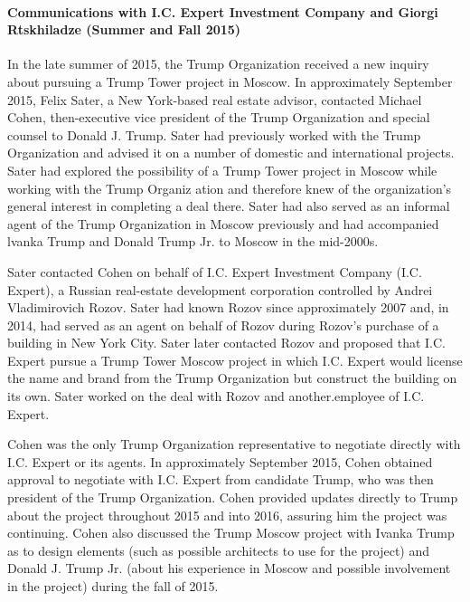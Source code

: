 \paragraph{Communications with I.C. Expert Investment Company and Giorgi Rtskhiladze (Summer and Fall 2015)}

In the late summer of 2015, the Trump Organization received a new inquiry about pursuing a Trump Tower project in Moscow.
In approximately September 2015, Felix Sater, a New York-based real estate advisor, contacted Michael Cohen, then-executive vice president of the Trump Organization and special counsel to Donald J. Trump.
Sater had previously worked with the Trump Organization and advised it on a number of domestic and international projects.
Sater had explored the possibility of a Trump Tower project in Moscow while working with the Trump Organiz ation and therefore knew of the organization's general interest in completing a deal there.
Sater had also served as an informal agent of the Trump Organization in Moscow previously and had accompanied lvanka Trump and Donald Trump Jr. to Moscow in the mid-2000s.

Sater contacted Cohen on behalf of I.C. Expert Investment Company (I.C. Expert), a Russian real-estate development corporation controlled by Andrei Vladimirovich Rozov.
Sater had known Rozov since approximately 2007 and, in 2014, had served as an agent on behalf of Rozov during Rozov's purchase of a building in New York City.
Sater later contacted Rozov and proposed that I.C. Expert pursue a Trump Tower Moscow project in which I.C. Expert would license the name and brand from the Trump Organization but construct the building on its own. Sater worked on the deal with Rozov and another.employee of I.C. Expert.

Cohen was the only Trump Organization representative to negotiate directly with I.C. Expert or its agents.
In approximately September 2015, Cohen obtained approval to negotiate with I.C. Expert from candidate Trump, who was then president of the Trump Organization.
Cohen provided updates directly to Trump about the project throughout 2015 and into 2016, assuring him the project was continuing.
Cohen also discussed the Trump Moscow project with Ivanka Trump as to design elements (such as possible architects to use for the project) and Donald J. Trump Jr. (about his experience in Moscow and possible involvement in the project) during the fall of 2015.

